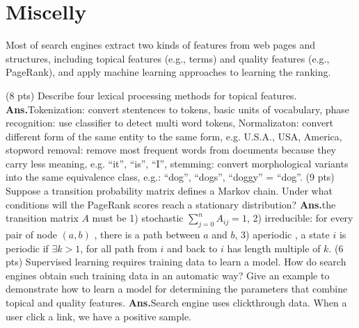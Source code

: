 \documentclass[11pt]{exam}
\newcommand{\ans}{\textbf{Ans.}}
\begin{document}
\section{Miscelly}
\begin{questions}
  \question  Most of search engines extract two kinds of features from web pages and structures, including topical features (e.g., terms) and quality features (e.g., PageRank), and apply machine learning approaches to learning the ranking.
\begin{subparts}
  \subpart (8 pts) Describe four lexical processing methods for topical features.
  \ans Tokenization: convert stentences to tokens, basic units of vocabulary, phase recognition: use classifier to 
  detect multi word tokens, Normalizaton: convert different form of the same entity to the same form, e.g. U.S.A., USA, 
  America, stopword removal: remove most frequent words from documents because they carry less meaning, 
  e.g. ``it'', ``is'', ``I'', stemming:  convert morphological variants into the 
  same equivalence class, e.g.: ``dog'', ``dogs'', ``doggy'' = ``dog''.
  \subpart (9 pts) Suppose a transition probability matrix defines a Markov chain. Under what
conditions will the PageRank scores reach a stationary distribution?
\ans the transition matrix $A$ must be 1) stochastic $\sum_{j=0}^n A_{ij}=1$, 2) irreducible: for every pair of node $(a,b)$ ,
there is a path between $a$ and $b$, 3) aperiodic , a state $i$ is periodic if $\exists k> 
1$,  for all path from $i$ and back to $i$ has length multiple of $k$.
 \subpart  (6 pts) Supervised learning requires training data to learn a model. How do search
engines obtain such training data in an automatic way? Give an example to demonstrate how to learn a model for determining the parameters that combine topical and quality features.
\ans Search engine uses clickthrough data. When a user click a link, we have a 
positive sample.
\end{subparts}
\end{questions}
\end{document}
